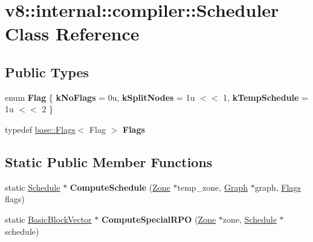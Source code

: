 \hypertarget{classv8_1_1internal_1_1compiler_1_1Scheduler}{}\section{v8\+:\+:internal\+:\+:compiler\+:\+:Scheduler Class Reference}
\label{classv8_1_1internal_1_1compiler_1_1Scheduler}
\subsection*{Public Types}
\begin{DoxyCompactItemize}
\item 
\mbox{\label{classv8_1_1internal_1_1compiler_1_1Scheduler_a7b78d98e449aadb3548a311754b624d5}} 
enum {\bfseries Flag} \{ {\bfseries k\+No\+Flags} = 0u, 
{\bfseries k\+Split\+Nodes} = 1u $<$$<$ 1, 
{\bfseries k\+Temp\+Schedule} = 1u $<$$<$ 2
 \}
\item 
\mbox{\label{classv8_1_1internal_1_1compiler_1_1Scheduler_a11c3273ecfdea86e069c3de0021859b5}} 
typedef \mbox{\hyperlink{classv8_1_1base_1_1Flags}{base\+::\+Flags}}$<$ Flag $>$ {\bfseries Flags}
\end{DoxyCompactItemize}
\subsection*{Static Public Member Functions}
\begin{DoxyCompactItemize}
\item 
\mbox{\label{classv8_1_1internal_1_1compiler_1_1Scheduler_ac76876be9571fecad702717c05d7f63d}} 
static \mbox{\hyperlink{classv8_1_1internal_1_1compiler_1_1Schedule}{Schedule}} $\ast$ {\bfseries Compute\+Schedule} (\mbox{\hyperlink{classv8_1_1internal_1_1Zone}{Zone}} $\ast$temp\+\_\+zone, \mbox{\hyperlink{classv8_1_1internal_1_1compiler_1_1Graph}{Graph}} $\ast$graph, \mbox{\hyperlink{classv8_1_1base_1_1Flags}{Flags}} flags)
\item 
\mbox{\label{classv8_1_1internal_1_1compiler_1_1Scheduler_ab81197c5c4cb6682f54f8b983af0a7df}} 
static \mbox{\hyperlink{classv8_1_1internal_1_1ZoneVector}{Basic\+Block\+Vector}} $\ast$ {\bfseries Compute\+Special\+R\+PO} (\mbox{\hyperlink{classv8_1_1internal_1_1Zone}{Zone}} $\ast$zone, \mbox{\hyperlink{classv8_1_1internal_1_1compiler_1_1Schedule}{Schedule}} $\ast$schedule)
\end{DoxyCompactItemize}
